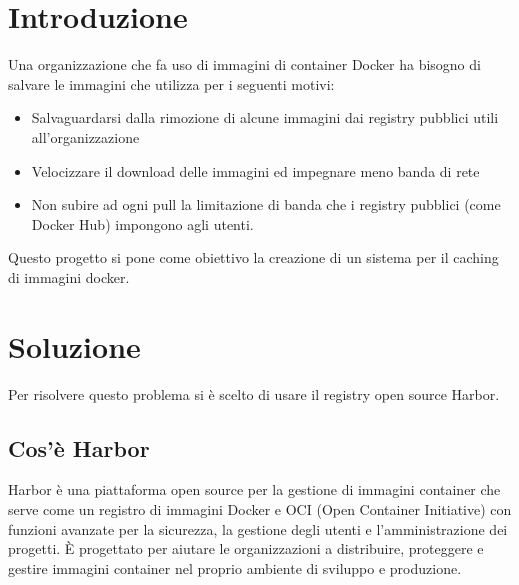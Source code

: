 \documentclass[12pt]{report}
\begin{document}
\title{}
\date{}



\maketitle
\tableofcontents

\chapter{Introduzione}
Una organizzazione che fa uso di immagini di container Docker ha bisogno di salvare le immagini che utilizza per i seguenti motivi:
\begin{itemize}
    \item Salvaguardarsi dalla rimozione di alcune immagini dai registry pubblici utili all'organizzazione
    \item Velocizzare il download delle immagini ed impegnare meno banda di rete
    \item Non subire ad ogni pull la limitazione di banda che i registry pubblici (come Docker Hub) impongono agli utenti\cite{hub-rate-limit}.
\end{itemize}
Questo progetto si pone come obiettivo la creazione di un sistema per il caching di immagini docker.

\chapter{Soluzione}
Per risolvere questo problema si è scelto di usare il registry open source Harbor.
\section{Cos'è Harbor}
Harbor\cite{harbor} è una piattaforma open source per la gestione di immagini container che serve come un registro di immagini Docker e OCI (Open Container Initiative) con funzioni avanzate per la sicurezza, la gestione degli utenti e l'amministrazione dei progetti. È progettato per aiutare le organizzazioni a distribuire, proteggere e gestire immagini container nel proprio ambiente di sviluppo e produzione.
\end{document}
